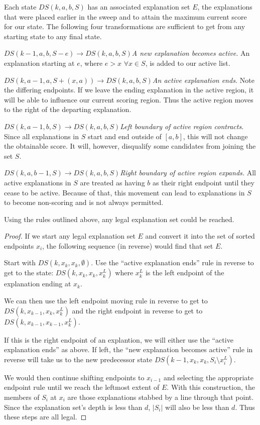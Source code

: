 Each state $DS(k,a,b,S)$ has an associated explanation set $E$, the explanations that were placed earlier in the sweep and to attain the maximum current score for our state.  The following four transformations are sufficient to get from any starting state to any final state.

$ DS(k-1,a,b,S-e) \rightarrow DS(k,a,b,S)${\it A new explanation becomes active.} An explanation starting at $e$, where $e > x$ \hspace{4pt} $ \forall x \in S$, is added to our active list.

$ DS(k,a-1,a,S + (x,a)) \rightarrow DS(k,a,b,S)${\it An active explanation ends.}  Note the differing endpoints.  If we leave the ending explanation in the active region, it will be able to influence our current scoring region. Thus the active region moves to the right of the departing explanation.

$DS(k,a-1,b,S) \rightarrow DS(k, a, b, S )${\it Left boundary of active region contracts.} Since all explanations in $S$ start and end outside of $[a,b]$, this will not change the obtainable score.  It will, however, disqualify some candidates from joining the set $S$.

$DS(k,a,b-1,S) \rightarrow DS(k, a, b, S )${\it Right boundary of active region expands.} All active explanations in $S$ are treated as having $b$ as their right endpoint until they cease to be active.  Because of that, this movement can lead to explanations in $S$ to become non-scoring and is not always permitted.

\begin{lem} \label{lem:dpCorrect}
Using the rules outlined above, any legal explanation set could be reached.
\end{lem}

\begin{proof}
If we start any legal explanation set $E$ and convert it into the set of sorted endpoints $x_i$, the following sequence (in reverse) would find that set $E$.  

Start with $DS(k,x_k,x_k,\emptyset)$.  Use the ``active explanation ends'' rule  in reverse to get to the state: $DS(k,x_k,x_k,{x^L_k})$ where $x^L_k$ is the left endpoint of the explanation ending at $x_k$.

We can then use the left endpoint moving rule in reverse to get to $DS(k,x_{k-1},x_k,{x^L_k})$ and the right endpoint in reverse to get to $DS(k,x_{k-1},x_{k-1},{x^L_k})$.

If this is the right endpoint of an explantion, we will either use the ``active explanation ends'' as above.  If left, the ``new explanation becomes active'' rule in reverse will take us to the new predecessor state $DS(k-1,x_k,x_k,S_i \setminus{x^L_i} )$.

We would then continue shifting endpoints to $x_{i-1}$ and selecting the appropriate endpoint rule until we reach the leftmost extent of $E$.  With this construction, the members of $S_i$ at $x_i$ are those explanations stabbed by a line through that point.  Since the explanation set's depth is less than $d$, $|S_i|$ will also be less than $d$.  Thus these steps are all legal.
\end{proof}

